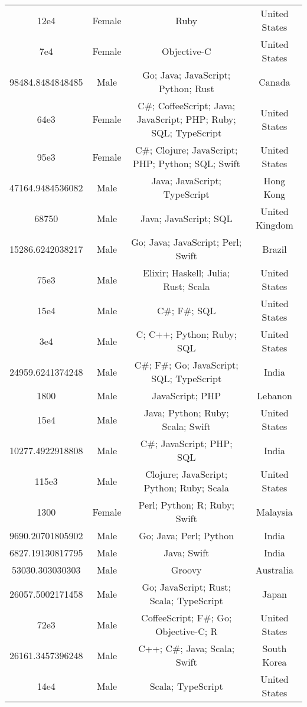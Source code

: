 \begin{center}
\begin{tabular}{ |c|c|c|c| }
12e4  &  Female  &  Ruby  &  United States  \\ 
7e4  &  Female  &  Objective-C  &  United States  \\ 
98484.8484848485  &  Male  &  Go; Java; JavaScript; Python; Rust  &  Canada  \\ 
64e3  &  Female  &  C\#; CoffeeScript; Java; JavaScript; PHP; Ruby; SQL; TypeScript  &  United States  \\ 
95e3  &  Female  &  C\#; Clojure; JavaScript; PHP; Python; SQL; Swift  &  United States  \\ 
47164.9484536082  &  Male  &  Java; JavaScript; TypeScript  &  Hong Kong  \\ 
68750  &  Male  &  Java; JavaScript; SQL  &  United Kingdom  \\ 
15286.6242038217  &  Male  &  Go; Java; JavaScript; Perl; Swift  &  Brazil  \\ 
75e3  &  Male  &  Elixir; Haskell; Julia; Rust; Scala  &  United States  \\ 
15e4  &  Male  &  C\#; F\#; SQL  &  United States  \\ 
3e4  &  Male  &  C; C++; Python; Ruby; SQL  &  United States  \\ 
24959.6241374248  &  Male  &  C\#; F\#; Go; JavaScript; SQL; TypeScript  &  India  \\ 
1800  &  Male  &  JavaScript; PHP  &  Lebanon  \\ 
15e4  &  Male  &  Java; Python; Ruby; Scala; Swift  &  United States  \\ 
10277.4922918808  &  Male  &  C\#; JavaScript; PHP; SQL  &  India  \\ 
115e3  &  Male  &  Clojure; JavaScript; Python; Ruby; Scala  &  United States  \\ 
1300  &  Female  &  Perl; Python; R; Ruby; Swift  &  Malaysia  \\ 
9690.20701805902  &  Male  &  Go; Java; Perl; Python  &  India  \\ 
6827.19130817795  &  Male  &  Java; Swift  &  India  \\ 
53030.303030303  &  Male  &  Groovy  &  Australia  \\ 
26057.5002171458  &  Male  &  Go; JavaScript; Rust; Scala; TypeScript  &  Japan  \\ 
72e3  &  Male  &  CoffeeScript; F\#; Go; Objective-C; R  &  United States  \\ 
26161.3457396248  &  Male  &  C++; C\#; Java; Scala; Swift  &  South Korea  \\ 
14e4  &  Male  &  Scala; TypeScript  &  United States  \\ 

\end{tabular}
\end{center}
